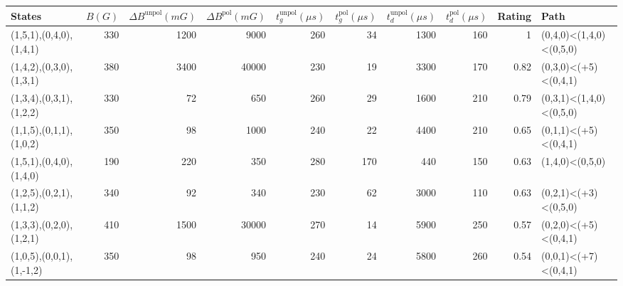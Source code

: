 \begin{tabular}{lrrrrrrrrl}
\hline
 {States}                 &   {$B(G)$} &   {$\Delta B^{\text{unpol}}(mG)$} &   {$\Delta B^{\text{pol}}(mG)$} &   {$t^{\text{unpol}}_{g}(\mu s)$} &   {$t^{\text{pol}}_{g}(\mu s)$} &   {$t^{\text{unpol}}_{d}(\mu s)$} &   {$t^{\text{pol}}_{d}(\mu s)$} &   {Rating} & {Path}                  \\
\hline
 (1,5,1),(0,4,0),(1,4,1)  &        330 &                              1200 &                            9000 &                               260 &                              34 &                              1300 &                             160 &       1    & (0,4,0)<(1,4,0)<(0,5,0) \\
 (1,4,2),(0,3,0),(1,3,1)  &        380 &                              3400 &                           40000 &                               230 &                              19 &                              3300 &                             170 &       0.82 & (0,3,0)<(+5)<(0,4,1)    \\
 (1,3,4),(0,3,1),(1,2,2)  &        330 &                                72 &                             650 &                               260 &                              29 &                              1600 &                             210 &       0.79 & (0,3,1)<(1,4,0)<(0,5,0) \\
 (1,1,5),(0,1,1),(1,0,2)  &        350 &                                98 &                            1000 &                               240 &                              22 &                              4400 &                             210 &       0.65 & (0,1,1)<(+5)<(0,4,1)    \\
 (1,5,1),(0,4,0),(1,4,0)  &        190 &                               220 &                             350 &                               280 &                             170 &                               440 &                             150 &       0.63 & (1,4,0)<(0,5,0)         \\
 (1,2,5),(0,2,1),(1,1,2)  &        340 &                                92 &                             340 &                               230 &                              62 &                              3000 &                             110 &       0.63 & (0,2,1)<(+3)<(0,5,0)    \\
 (1,3,3),(0,2,0),(1,2,1)  &        410 &                              1500 &                           30000 &                               270 &                              14 &                              5900 &                             250 &       0.57 & (0,2,0)<(+5)<(0,4,1)    \\
 (1,0,5),(0,0,1),(1,-1,2) &        350 &                                98 &                             950 &                               240 &                              24 &                              5800 &                             260 &       0.54 & (0,0,1)<(+7)<(0,4,1)    \\
\hline
\end{tabular}